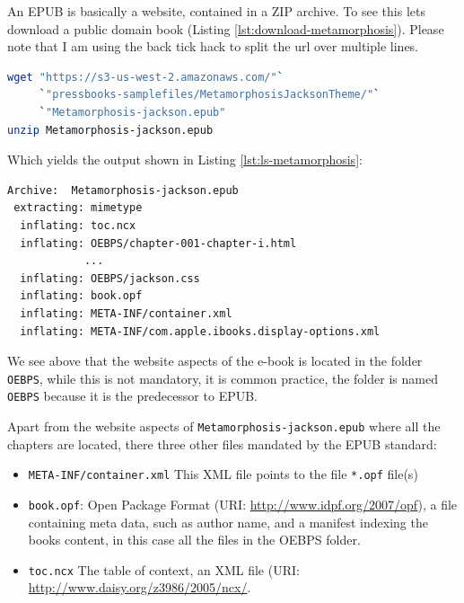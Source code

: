 \documentclass[]{report}   %
\begin{document}
An EPUB is basically a website, contained in a ZIP archive. To see this lets download a public domain book (Listing \ref{lst:download-metamorphosis}). Please note that I am using the back tick hack to split the url over multiple lines.

\begin{minipage}{\linewidth}
\begin{lstlisting}[language=bash, label={lst:download-metamorphosis}, 
				   caption={Downloading and unzipping an ebook}]
wget "https://s3-us-west-2.amazonaws.com/"`
     `"pressbooks-samplefiles/MetamorphosisJacksonTheme/"`
     `"Metamorphosis-jackson.epub"
unzip Metamorphosis-jackson.epub
\end{lstlisting}
\end{minipage}

Which yields the output shown in Listing \ref{lst:ls-metamorphosis}:

\begin{minipage}{\linewidth}
\begin{lstlisting}[language=bash, label={lst:ls-metamorphosis}, 
				   caption={Metamorphisis EPUB file structure}]
Archive:  Metamorphosis-jackson.epub
 extracting: mimetype
  inflating: toc.ncx
  inflating: OEBPS/chapter-001-chapter-i.html
            ...
  inflating: OEBPS/jackson.css
  inflating: book.opf
  inflating: META-INF/container.xml
  inflating: META-INF/com.apple.ibooks.display-options.xml
\end{lstlisting}
\end{minipage}

We see above that the website aspects of the e-book is located in the folder
\texttt{OEBPS}, while this is not mandatory, it is common practice, the folder
is named \texttt{OEBPS} because it is the predecessor to EPUB.

Apart from the website aspects of \texttt{Metamorphosis-jackson.epub} where all
the chapters are located, there three other files mandated by the EPUB
standard\cite{epub301}:
\begin{itemize}
	\item \texttt{META-INF/container.xml} This XML file points to the file \texttt{*.opf} file(s)
    \item \texttt{book.opf}: Open Package Format (URI:
          \url{http://www.idpf.org/2007/opf}), a file containing meta data, such as
          author name, and a manifest indexing the books content, in this case all
          the files in the OEBPS folder.
    \item \texttt{toc.ncx} The table of context, an XML file (URI:
          \url{http://www.daisy.org/z3986/2005/ncx/}.
\end{itemize}
\end{document}
